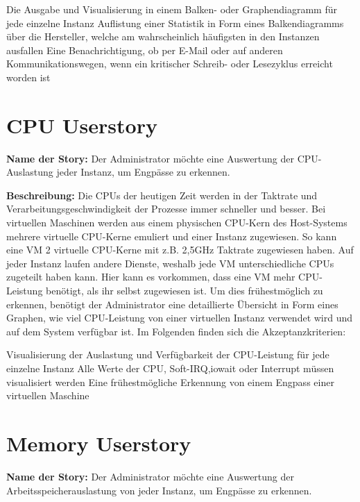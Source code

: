 \begin{outline}
  \1 Die Ausgabe und Visualisierung in einem Balken- oder Graphendiagramm
  für jede einzelne Instanz
  \1 Auflistung einer Statistik in Form eines Balkendiagramms über die
  Hersteller, welche am wahrscheinlich häufigsten in den Instanzen ausfallen
  \1 Eine Benachrichtigung, ob per E-Mail oder auf anderen Kommunikationswegen,
  wenn ein kritischer Schreib- oder Lesezyklus erreicht worden ist
\end{outline}
\mr%

\section{CPU Userstory}
\label{section:CPU_Userstory}
\textbf{Name der Story:} Der Administrator möchte eine Auswertung der
CPU-Auslastung jeder Instanz, um Engpässe zu erkennen.

\textbf{Beschreibung:} Die CPUs der heutigen Zeit werden in der Taktrate und
Verarbeitungsgeschwindigkeit der Prozesse immer schneller und besser. Bei
virtuellen Maschinen werden aus einem physischen CPU-Kern des Host-Systems
mehrere virtuelle CPU-Kerne emuliert und einer Instanz zugewiesen. So kann eine
VM 2 virtuelle CPU-Kerne mit z.B. 2,5\si{\giga\hertz} Taktrate zugewiesen
haben. Auf jeder Instanz laufen andere Dienste, weshalb jede VM
unterschiedliche CPUs zugeteilt haben kann. Hier kann es vorkommen, dass eine
VM mehr CPU-Leistung benötigt, als ihr selbst zugewiesen ist. Um dies
frühestmöglich zu erkennen, benötigt der Administrator eine detaillierte
Übersicht in Form eines Graphen, wie viel CPU-Leistung von einer virtuellen
Instanz verwendet wird und auf dem System verfügbar ist. Im Folgenden finden
sich die Akzeptanzkriterien:

\begin{outline}
  \1 Visualisierung der Auslastung und Verfügbarkeit der CPU-Leistung für jede
  einzelne Instanz
  \1 Alle Werte der CPU, \gls{Soft-IRQ},\gls{iowait} oder \gls{Interrupt}
  müssen visualisiert werden
  \1 Eine frühestmögliche Erkennung von einem Engpass einer virtuellen Maschine
\end{outline}
\mr%

\section{Memory Userstory}
\textbf{Name der Story:} Der Administrator möchte eine Auswertung der
Arbeitsspeicherauslastung von jeder Instanz, um Engpässe zu erkennen.

